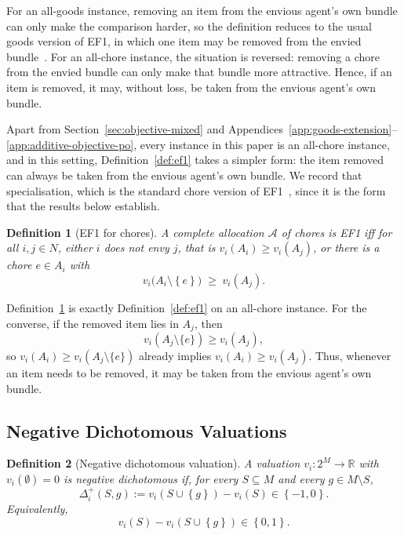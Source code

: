 \documentclass[11pt]{article}
\theoremstyle{plain}
\newtheorem{definition}{Definition}
\theoremstyle{plain}
\newcommand{\agents}{N}                       %
\newcommand{\items}{M}                        %
\newcommand{\alloc}{\mathcal{A}}              %
\newcommand{\bundle}[1]{A_{#1}}
\newcommand{\margplus}[3]{\Delta^{+}_{#1}(#2,#3)}
\newcommand{\R}{\mathbb{R}}
\newcommand{\set}[1]{\left\{#1\right\}}
\begin{document}
For an all-goods instance, removing an item from the envious agent's own bundle can only make the comparison harder, so the definition reduces to the usual goods version of EF1, in which one item may be removed from the envied bundle~\cite{HS19}. For an all-chore instance, the situation is reversed: removing a chore from the envied bundle can only make that bundle more attractive. Hence, if an item is removed, it may, without loss, be taken from the envious agent's own bundle.

Apart from Section~\ref{sec:objective-mixed} and Appendices~\ref{app:goods-extension}--\ref{app:additive-objective-po}, every instance in this paper is an all-chore instance, and in this setting, Definition~\ref{def:ef1} takes a simpler form: the item removed can always be taken from the envious agent's own bundle. We record that specialisation, which is the standard chore version of EF1~\cite{aziz2019fair}, since it is the form that the results below establish.

\begin{definition}[EF1 for chores] \label{def:ef1chores}
A complete allocation $\alloc$ of chores is \emph{EF1} iff for all $i, j \in \agents$, either $i$ does not envy $j$, that is $v_i(\bundle i) \ge v_i(\bundle j)$, or there is a chore $e \in \bundle i$ with
\[
  v_i\bigl(\bundle i \setminus \set e\bigr) \;\ge\; v_i(\bundle j).
\]
\end{definition}

Definition~\ref{def:ef1chores} is exactly Definition~\ref{def:ef1} on an all-chore instance. For the converse, if the removed item lies in $A_j$, then
\[
    v_i(A_j\setminus\{e\})\geq v_i(A_j),
\]
so $v_i(A_i)\geq v_i(A_j\setminus\{e\})$ already implies $v_i(A_i)\geq v_i(A_j)$. Thus, whenever an item needs to be removed, it may be taken from the envious agent's own bundle.


\subsection{Negative Dichotomous Valuations}
\label{sec:negdich}

\begin{definition}[Negative dichotomous valuation] \label{def:negdich}
A valuation $v_i:2^{\items}\to\R$ with $v_i(\emptyset)=0$ is \emph{negative dichotomous} if, for every $S\subseteq\items$ and every $g\in\items\setminus S$,
\[
    \margplus{i}{S}{g}
    :=v_i(S\cup\set{g})-v_i(S)
    \in\set{-1,0}.
\]
Equivalently,
\[
    v_i(S)-v_i(S\cup\set{g})\in\set{0,1}.
\]
\end{definition}
\end{document}
